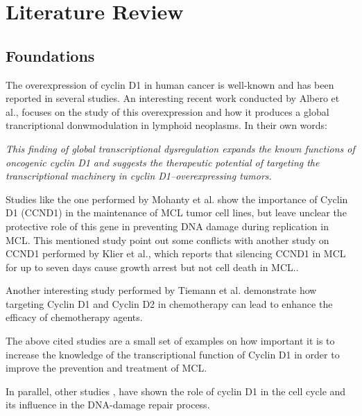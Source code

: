 
\section{Literature Review}
\subsection{Foundations}

The overexpression of cyclin D1 in human cancer is well-known\cite{Lamb2003} and has been reported in several studies\cite{2017Reena}.
An interesting recent work conducted by Albero et al.\cite{10.1172/JCI96520}, focuses on the study of this overexpression and how it produces a global trancriptional donwmodulation in lymphoid neoplasms. In their own words:

\textit{This finding of global transcriptional dysregulation expands the known functions of oncogenic cyclin D1 and suggests the therapeutic potential of targeting the transcriptional machinery in cyclin D1–overexpressing tumors.}
\cite{10.1172/JCI96520}

Studies like the one performed by Mohanty et al.\cite{Mohanty2017} show the importance of Cyclin D1 (CCND1) in the maintenance of MCL tumor cell lines, but leave unclear the protective role of this gene in preventing DNA damage during replication in MCL. This mentioned study point out some conflicts with another study on CCND1 performed by Klier et al.\cite{Klier2008}, which reports that silencing CCND1 in MCL for up to seven days cause growth arrest but not cell death in MCL.\cite{Mohanty2017}.

Another interesting study performed by Tiemann et al.\cite{Tiemann2011} demonstrate how targeting Cyclin D1 and Cyclin D2 in chemotherapy can lead to enhance the efficacy of chemotherapy agents.

The above cited studies are a small set of examples on how important it is to increase the knowledge of the transcriptional function of Cyclin D1 in order to improve the prevention and treatment of MCL.

In parallel, other studies \cite{DiSante2017} \cite{Casimiro2016}, have shown the role of cyclin D1 in the cell cycle and its influence in the DNA-damage repair process.

